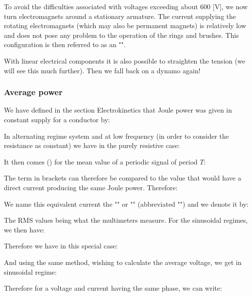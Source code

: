 	To avoid the difficulties associated with voltages exceeding about $600$ [V], we now turn electromagnets around a stationary armature. The current supplying the rotating electromagnets (which may also be permanent magnets) is relatively low and does not pose any problem to the operation of the rings and brushes. This configuration is then referred to as an "".

	With linear electrical components it is also possible to straighten the tension (we will see this much further). Then we fall back on a dynamo again!
	
	\subsubsection{Average power}
	We have defined in the section Electrokinetics that Joule power was given in constant supply for a conductor by:
	
	In alternating regime system and at low frequency (in order to consider the resistance as constant) we have in the purely resistive case:
	
	It then comes () for the mean value of a periodic signal of period $T$:
	
	The term in brackets can therefore be compared to the value that would have a direct current producing the same Joule power. Therefore:
	
	We name this equivalent current the "" or "" (abbreviated "") and we denote it by:
	
	The RMS values being what the multimeters measure. For the sinusoidal regimes, we then have:
	
	Therefore we have in this special case:
	
	And using the same method, wishing to calculate the average voltage, we get in sinusoidal regime:
	
	Therefore for a voltage and current having the same phase, we can write:
	
